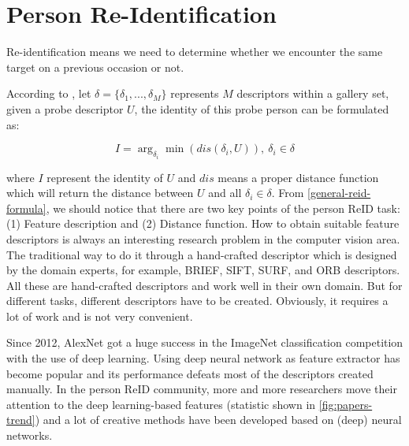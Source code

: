 \section{Person Re-Identification}
\label{sec:related_work_re_id}

%

Re-identification means we need to determine whether we encounter the same 
target on a previous occasion or not.

According to \cite{survey-on-dl-for-reid-2019}, let $\delta=\{\delta_1, ...,
\delta_M \}$ represents $M$ descriptors within a gallery set, given a probe
descriptor $U$, the identity of this probe person can be formulated as:

\begin{equation}
\label{general-reid-formula}
I = \arg_{\delta_i} \min (dis(\delta_i, U)),  \: \delta_i \in \delta
\end{equation}

\noindent 
where $I$ represent the identity of $U$ and $dis$ means a proper distance
function which will return the distance between $U$ and all $\delta_i \in 
\delta$. From \autoref{general-reid-formula}, we should notice that there are 
two key points of the person ReID task:
(1) Feature description and (2) Distance function.
How to obtain suitable feature descriptors is always an interesting research
problem in the computer vision area. The traditional way to do it through
a hand-crafted descriptor which is designed by the domain experts, for
example, BRIEF, SIFT, SURF, and ORB descriptors. All these are hand-crafted
descriptors and work well in their own domain. But for different tasks, 
different
descriptors have to be created. Obviously, it requires a lot of work and is not
very convenient.

Since 2012, AlexNet \cite{imagenet-classifi-cnn} got a huge success in the
ImageNet classification competition with the use of deep learning. Using deep
neural network as feature extractor has become popular and its performance defeats
most of the descriptors created manually. In the person ReID community, more 
and more researchers move their attention to the deep learning-based features 
(statistic shown in \autoref{fig:papers-trend}) and a lot of creative methods 
have been developed based on (deep) neural networks.


